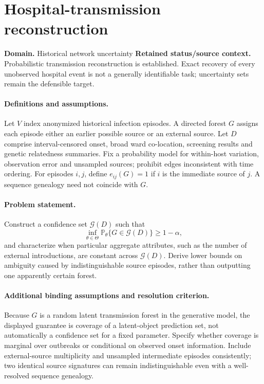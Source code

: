\documentclass[11pt]{article}
\begin{document}
\section*{Hospital-transmission reconstruction}
\label{prob:216}
\label{rank:287}
\par\smallskip

\noindent\textbf{Domain.} Historical network uncertainty \quad \textbf{Retained status/source context.} Probabilistic transmission reconstruction is established. Exact recovery of every unobserved hospital event is not a generally identifiable task; uncertainty sets remain the defensible target.
\paragraph{Definitions and assumptions.} Let $V$ index anonymized historical infection episodes. A directed forest $G$ assigns each episode either an earlier possible source or an external source. Let $D$ comprise interval-censored onset, broad ward co-location, screening results and genetic relatedness summaries. Fix a probability model for within-host variation, observation error and unsampled sources; prohibit edges inconsistent with time ordering. For episodes $i,j$, define $e_{ij}(G)=1$ if $i$ is the immediate source of $j$. A sequence genealogy need not coincide with $G$.
\paragraph{Problem statement.} Construct a confidence set $\mathcal G(D)$ such that
    \[\inf_{\theta\in\Theta}\mathbb{P}_\theta\{G\in\mathcal G(D)\}\geq1-\alpha,\]
    and characterize when particular aggregate attributes, such as the number of external introductions, are constant across $\mathcal G(D)$. Derive lower bounds on ambiguity caused by indistinguishable source episodes, rather than outputting one apparently certain forest.
\paragraph{Additional binding assumptions and resolution criterion.} Because $G$ is a random latent transmission forest in the generative model, the displayed guarantee is coverage of a latent-object prediction set, not automatically a confidence set for a fixed parameter. Specify whether coverage is marginal over outbreaks or conditional on observed onset information. Include external-source multiplicity and unsampled intermediate episodes consistently; two identical source signatures can remain indistinguishable even with a well-resolved sequence genealogy.
\end{document}
